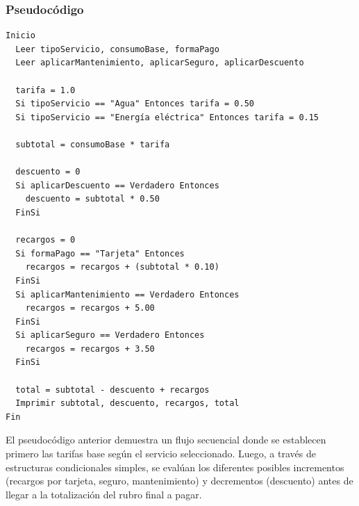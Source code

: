 \documentclass[12pt, a4paper]{article}
\begin{document}
\subsubsection{Pseudocódigo}
\begin{verbatim}
Inicio
  Leer tipoServicio, consumoBase, formaPago
  Leer aplicarMantenimiento, aplicarSeguro, aplicarDescuento
  
  tarifa = 1.0
  Si tipoServicio == "Agua" Entonces tarifa = 0.50
  Si tipoServicio == "Energía eléctrica" Entonces tarifa = 0.15
  
  subtotal = consumoBase * tarifa
  
  descuento = 0
  Si aplicarDescuento == Verdadero Entonces 
    descuento = subtotal * 0.50
  FinSi
  
  recargos = 0
  Si formaPago == "Tarjeta" Entonces 
    recargos = recargos + (subtotal * 0.10)
  FinSi
  Si aplicarMantenimiento == Verdadero Entonces 
    recargos = recargos + 5.00
  FinSi
  Si aplicarSeguro == Verdadero Entonces 
    recargos = recargos + 3.50
  FinSi
  
  total = subtotal - descuento + recargos
  Imprimir subtotal, descuento, recargos, total
Fin
\end{verbatim}
\vspace{0.3cm}
El pseudocódigo anterior demuestra un flujo secuencial donde se establecen primero las tarifas base según el servicio seleccionado. Luego, a través de estructuras condicionales simples, se evalúan los diferentes posibles incrementos (recargos por tarjeta, seguro, mantenimiento) y decrementos (descuento) antes de llegar a la totalización del rubro final a pagar.
\end{document}
